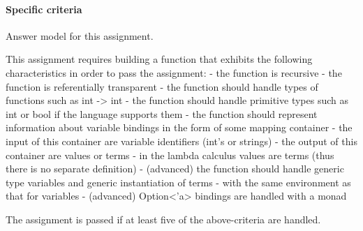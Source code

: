 \documentclass[10pt,a4paper]{article}
\begin{document}
\paragraph{Specific criteria}
Answer model for this assignment.

This assignment requires building a function that exhibits the following characteristics in order to pass the assignment:
- the function is recursive
- the function is referentially transparent
- the function should handle types of functions such as int -> int
- the function should handle primitive types such as int or bool if the language supports them
- the function should represent information about variable bindings in the form of some mapping container 
  - the input of this container are variable identifiers (int's or strings)
  - the output of this container are values or terms
  - in the lambda calculus values are terms (thus there is no separate definition)
- (advanced) the function should handle generic type variables and generic instantiation of terms
  - with the same environment as that for variables
- (advanced) Option<'a> bindings are handled with a monad

The assignment is passed if at least five of the above-criteria are handled.
\end{document}
